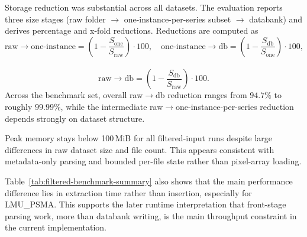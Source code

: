 Storage reduction was substantial across all datasets. The evaluation reports three size stages (raw folder $\rightarrow$ one-instance-per-series subset $\rightarrow$ databank) and derives percentage and x-fold reductions. Reductions are computed as
\[
\text{raw}\rightarrow\text{one-instance}=\left(1-\frac{S_{\text{one}}}{S_{\text{raw}}}\right)\cdot100,\quad
\text{one-instance}\rightarrow\text{db}=\left(1-\frac{S_{\text{db}}}{S_{\text{one}}}\right)\cdot100,\quad
\] \\
\[
\text{raw}\rightarrow\text{db}=\left(1-\frac{S_{\text{db}}}{S_{\text{raw}}}\right)\cdot100.
\]
Across the benchmark set, overall raw$\rightarrow$db reduction ranges from $94.7\%$ to roughly $99.99\%$, while the intermediate raw$\rightarrow$one-instance-per-series reduction depends strongly on dataset structure.

\begin{table}[htbp]
\centering
\caption{Filtered-input benchmark summary: runtime decomposition, peak RSS, and absolute storage sizes.}
\label{tab:filtered-benchmark-summary}
\end{table}

Peak memory stays below 100\,MiB for all filtered-input runs despite large differences in raw dataset size and file count. This appears consistent with metadata-only parsing and bounded per-file state rather than pixel-array loading.

Table~\ref{tab:filtered-benchmark-summary} also shows that the main performance difference lies in extraction time rather than insertion, especially for LMU\_PSMA. This supports the later runtime interpretation that front-stage parsing work, more than databank writing, is the main throughput constraint in the current implementation.

